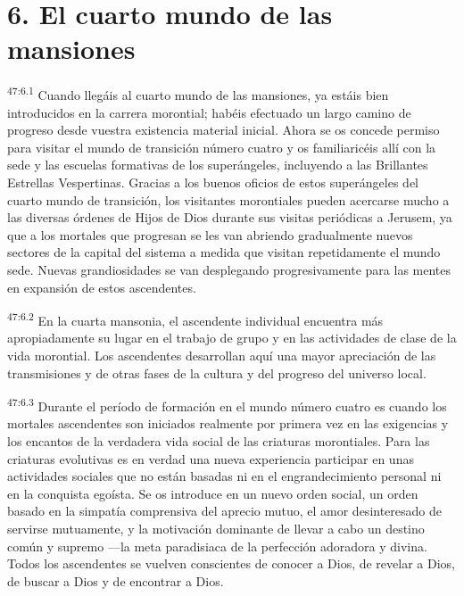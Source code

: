 \section*{6. El cuarto mundo de las mansiones}
\par
\textsuperscript{47:6.1} Cuando llegáis al cuarto mundo de las mansiones, ya estáis bien introducidos en la carrera morontial; habéis efectuado un largo camino de progreso desde vuestra existencia material inicial. Ahora se os concede permiso para visitar el mundo de transición número cuatro y os familiaricéis allí con la sede y las escuelas formativas de los superángeles, incluyendo a las Brillantes Estrellas Vespertinas. Gracias a los buenos oficios de estos superángeles del cuarto mundo de transición, los visitantes morontiales pueden acercarse mucho a las diversas órdenes de Hijos de Dios durante sus visitas periódicas a Jerusem, ya que a los mortales que progresan se les van abriendo gradualmente nuevos sectores de la capital del sistema a medida que visitan repetidamente el mundo sede. Nuevas grandiosidades se van desplegando progresivamente para las mentes en expansión de estos ascendentes.

\par
\textsuperscript{47:6.2} En la cuarta mansonia, el ascendente individual encuentra más apropiadamente su lugar en el trabajo de grupo y en las actividades de clase de la vida morontial. Los ascendentes desarrollan aquí una mayor apreciación de las transmisiones y de otras fases de la cultura y del progreso del universo local.

\par
\textsuperscript{47:6.3} Durante el período de formación en el mundo número cuatro es cuando los mortales ascendentes son iniciados realmente por primera vez en las exigencias y los encantos de la verdadera vida social de las criaturas morontiales. Para las criaturas evolutivas es en verdad una nueva experiencia participar en unas actividades sociales que no están basadas ni en el engrandecimiento personal ni en la conquista egoísta. Se os introduce en un nuevo orden social, un orden basado en la simpatía comprensiva del aprecio mutuo, el amor desinteresado de servirse mutuamente, y la motivación dominante de llevar a cabo un destino común y supremo ---la meta paradisiaca de la perfección adoradora y divina. Todos los ascendentes se vuelven conscientes de conocer a Dios, de revelar a Dios, de buscar a Dios y de encontrar a Dios.


